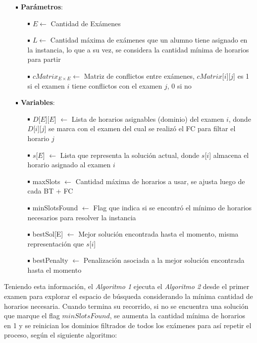 \documentclass[letter, 10pt]{article}
\newcommand*\sq{\mathbin{\vcenter{\hbox{\rule{.7ex}{.7ex}}}}}
\begin{document}
\begin{itemize}
	\item[$\sq$] \textbf{Parámetros}:
	\begin{itemize}
		\item[$\sq$] $E \leftarrow$ Cantidad de Exámenes
		\item[$\sq$] $L \leftarrow$ Cantidad máxima de exámenes que un alumno tiene asignado en la instancia, lo que a su vez, se considera la cantidad mínima de horarios para partir
		\item[$\sq$] $cMatrix_{E \times E} \leftarrow$ Matriz de conflictos entre exámenes, $cMatrix$[$i$][$j$] es 1 si el examen $i$ tiene conflictos con el examen $j$, 0 si no
	\end{itemize}
	\item[$\sq$] \textbf{Variables}:
	\begin{itemize}
		\item[$\sq$] $D$[$E$][$E$] $\leftarrow$ Lista de horarios asignables (dominio) del examen $i$, donde $D$[$i$][$j$] se marca con el examen del cual se realizó el FC para filtar el horario $j$
		\item[$\sq$] $s$[$E$] $\leftarrow$ Lista que representa la solución actual, donde $s$[$i$] almacena el horario asignado al examen $i$
		\item[$\sq$] maxSlots $\leftarrow$ Cantidad máxima de horarios a usar, se ajusta luego de cada BT + FC
		\item[$\sq$] minSlotsFound $\leftarrow$ Flag que indica si se encontró el mínimo de horarios necesarios para resolver la instancia
		\item[$\sq$] bestSol[E] $\leftarrow$ Mejor solución encontrada hasta el momento, misma representación que $s$[$i$]
		\item[$\sq$] bestPenalty $\leftarrow$ Penalización asociada a la mejor solución encontrada hasta el momento
	\end{itemize}
\end{itemize}

Teniendo esta información, el \textit{Algoritmo 1} ejecuta el \textit{Algoritmo 2} desde el primer examen para explorar el espacio de búsqueda considerando la mínima cantidad de horarios necesaria. Cuando termina su recorrido, si no se encuentra una solución que marque el flag $minSlotsFound$, se aumenta la cantidad mínima de horarios en 1 y se reinician los dominios filtrados de todos los exámenes para así repetir el proceso, según el siguiente algoritmo:\\
\end{document}
